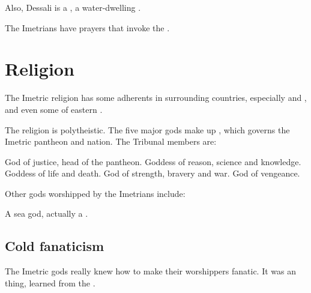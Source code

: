 Also, Dessali is a \naiad, a water-dwelling . 

The Imetrians have prayers that invoke the \nagae. 









\section{Religion}
The Imetric religion has some adherents in surrounding countries, especially  and , and even some of eastern . 

The religion is polytheistic. 
The five major gods make up , which governs the Imetric pantheon and nation. 
The Tribunal members are: 
  
\begin{gloss}
    God of justice, head of the pantheon.
    Goddess of reason, science and knowledge. 
  \index{\NishiS}
    Goddess of life and death. 
    God of strength, bravery and war. 
  \gitemlink[Hiothrex]{\Hiothrex}
  \index{\Hiothrex}
    God of vengeance. 
\end{gloss}

Other gods worshipped by the Imetrians include: 

\begin{gloss}
  A sea god, actually a \nagalord. 
\end{gloss}





\subsection{Cold fanaticism}
The Imetric gods really knew how to make their worshippers fanatic. 
It was an  thing, learned from the \nagae. 

